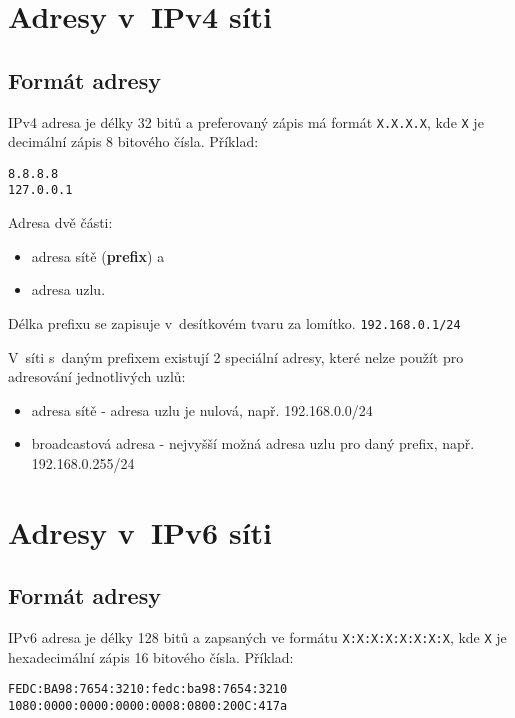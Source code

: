\section{Adresy v~IPv4 síti}\label{adresy_ipv4}

\subsection{Formát adresy}
IPv4 adresa je délky 32 bitů a preferovaný zápis má formát {\tt X.X.X.X}, kde
{\tt X} je decimální zápis 8 bitového čísla. Příklad:\\
\begin{verbatim}
8.8.8.8
127.0.0.1
\end{verbatim}

Adresa dvě části:
\begin{itemize}
    \item adresa sítě ({\bf prefix}) a
    \item adresa uzlu.
\end{itemize}
Délka prefixu se zapisuje v~desítkovém tvaru za lomítko. {\tt 192.168.0.1/24}

V~síti s~daným prefixem existují 2 speciální adresy, které nelze použít pro
adresování jednotlivých uzlů:
\begin{itemize}
    \item adresa sítě - adresa uzlu je nulová, např. 192.168.0.0/24
    \item broadcastová adresa - nejvyšší možná adresa uzlu pro daný prefix,
        např. 192.168.0.255/24
\end{itemize}

\section{Adresy v~IPv6 síti}\label{adresy_ipv6}

\subsection{Formát adresy}
IPv6 adresa je délky 128 bitů a zapsaných ve formátu {\tt X:X:X:X:X:X:X:X}, kde
{\tt X} je hexadecimální zápis 16 bitového čísla.
Příklad:\\
\begin{verbatim}
FEDC:BA98:7654:3210:fedc:ba98:7654:3210
1080:0000:0000:0000:0008:0800:200C:417a
\end{verbatim}

